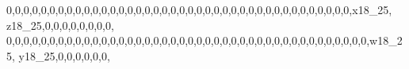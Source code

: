 \documentclass[]{article}
\newenvironment{Shaded}{\begin{snugshade}}{\end{snugshade}}
\newcommand{\DecValTok}[1]{\textcolor[rgb]{0.00,0.00,0.81}{#1}}
\newcommand{\NormalTok}[1]{#1}
\begin{document}
\begin{Shaded}
\begin{Highlighting}[]
\DecValTok{0}\NormalTok{,}\DecValTok{0}\NormalTok{,}\DecValTok{0}\NormalTok{,}\DecValTok{0}\NormalTok{,}\DecValTok{0}\NormalTok{,}\DecValTok{0}\NormalTok{,}\DecValTok{0}\NormalTok{,}\DecValTok{0}\NormalTok{,}\DecValTok{0}\NormalTok{,}\DecValTok{0}\NormalTok{,}\DecValTok{0}\NormalTok{,}\DecValTok{0}\NormalTok{,}\DecValTok{0}\NormalTok{,}\DecValTok{0}\NormalTok{,}\DecValTok{0}\NormalTok{,}\DecValTok{0}\NormalTok{,}\DecValTok{0}\NormalTok{,}\DecValTok{0}\NormalTok{,}\DecValTok{0}\NormalTok{,}\DecValTok{0}\NormalTok{,}\DecValTok{0}\NormalTok{,}\DecValTok{0}\NormalTok{,}\DecValTok{0}\NormalTok{,}\DecValTok{0}\NormalTok{,}\DecValTok{0}\NormalTok{,}\DecValTok{0}\NormalTok{,}\DecValTok{0}\NormalTok{,}\DecValTok{0}\NormalTok{,}\DecValTok{0}\NormalTok{,}\DecValTok{0}\NormalTok{,}\DecValTok{0}\NormalTok{,}\DecValTok{0}\NormalTok{,}\DecValTok{0}\NormalTok{,}\DecValTok{0}\NormalTok{,}\DecValTok{0}\NormalTok{,}\DecValTok{0}\NormalTok{,}\DecValTok{0}\NormalTok{,}\DecValTok{0}\NormalTok{,}\DecValTok{0}\NormalTok{,}\DecValTok{0}\NormalTok{,x18_}\DecValTok{25}\NormalTok{, z18_}\DecValTok{25}\NormalTok{,}\DecValTok{0}\NormalTok{,}\DecValTok{0}\NormalTok{,}\DecValTok{0}\NormalTok{,}\DecValTok{0}\NormalTok{,}\DecValTok{0}\NormalTok{,}\DecValTok{0}\NormalTok{,}\DecValTok{0}\NormalTok{,}\DecValTok{0}\NormalTok{,}
\DecValTok{0}\NormalTok{,}\DecValTok{0}\NormalTok{,}\DecValTok{0}\NormalTok{,}\DecValTok{0}\NormalTok{,}\DecValTok{0}\NormalTok{,}\DecValTok{0}\NormalTok{,}\DecValTok{0}\NormalTok{,}\DecValTok{0}\NormalTok{,}\DecValTok{0}\NormalTok{,}\DecValTok{0}\NormalTok{,}\DecValTok{0}\NormalTok{,}\DecValTok{0}\NormalTok{,}\DecValTok{0}\NormalTok{,}\DecValTok{0}\NormalTok{,}\DecValTok{0}\NormalTok{,}\DecValTok{0}\NormalTok{,}\DecValTok{0}\NormalTok{,}\DecValTok{0}\NormalTok{,}\DecValTok{0}\NormalTok{,}\DecValTok{0}\NormalTok{,}\DecValTok{0}\NormalTok{,}\DecValTok{0}\NormalTok{,}\DecValTok{0}\NormalTok{,}\DecValTok{0}\NormalTok{,}\DecValTok{0}\NormalTok{,}\DecValTok{0}\NormalTok{,}\DecValTok{0}\NormalTok{,}\DecValTok{0}\NormalTok{,}\DecValTok{0}\NormalTok{,}\DecValTok{0}\NormalTok{,}\DecValTok{0}\NormalTok{,}\DecValTok{0}\NormalTok{,}\DecValTok{0}\NormalTok{,}\DecValTok{0}\NormalTok{,}\DecValTok{0}\NormalTok{,}\DecValTok{0}\NormalTok{,}\DecValTok{0}\NormalTok{,}\DecValTok{0}\NormalTok{,}\DecValTok{0}\NormalTok{,}\DecValTok{0}\NormalTok{,}\DecValTok{0}\NormalTok{,}\DecValTok{0}\NormalTok{,w18_}\DecValTok{25}\NormalTok{, y18_}\DecValTok{25}\NormalTok{,}\DecValTok{0}\NormalTok{,}\DecValTok{0}\NormalTok{,}\DecValTok{0}\NormalTok{,}\DecValTok{0}\NormalTok{,}\DecValTok{0}\NormalTok{,}\DecValTok{0}\NormalTok{,}

\end{Highlighting}
\end{Shaded}
\end{document}
